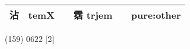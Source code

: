 \documentclass[14pt,a4paper]{scrartcl}
\begin{document}
\begin{longtable}[c]{@{}llllll@{}}
\begin{minipage}[t]{0.14\columnwidth}
沾
\strut\end{minipage} &
\begin{minipage}[t]{0.14\columnwidth}\raggedright\strut
temX
\strut\end{minipage} &
\begin{minipage}[t]{0.14\columnwidth}\raggedright\strut
\strut\end{minipage} &
\begin{minipage}[t]{0.14\columnwidth}\raggedright\strut
霑 trjem
\strut\end{minipage} &
\begin{minipage}[t]{0.14\columnwidth}\raggedright\strut
\strut\end{minipage} &
\begin{minipage}[t]{0.14\columnwidth}\raggedright\strut
pure:other
\strut\end{minipage}\tabularnewline
\bottomrule
\end{longtable}

(159) 0622 {[}2{]}
\end{document}
